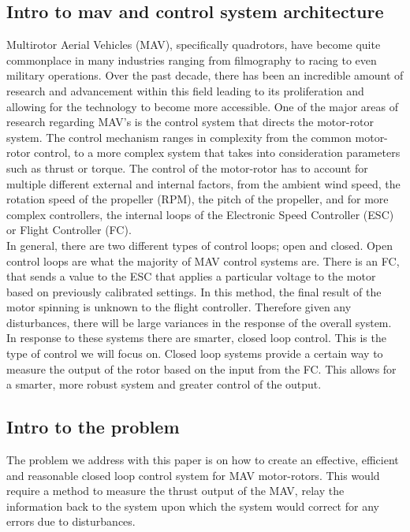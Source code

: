 \documentclass[conference]{IEEEtran}
\begin{document}
	\subsection{Intro to mav and control system architecture}
	Multirotor Aerial Vehicles (MAV), specifically quadrotors, have become quite commonplace in many industries ranging from filmography to racing to even military operations. Over the past decade, there has been an incredible amount of research and advancement within this field leading to its proliferation and allowing for the technology to become more accessible. One of the major areas of research regarding MAV's is the control system that directs the motor-rotor system. The control mechanism ranges in complexity from the common motor-rotor control, to a more complex system that takes into consideration parameters such as thrust or torque. The control of the motor-rotor has to account for multiple different external and internal factors, from the ambient wind speed, the rotation speed of the propeller (RPM), the pitch of the propeller, and for more complex controllers, the internal loops of the Electronic Speed Controller (ESC) or Flight Controller (FC). \\
	In general, there are two different types of control loops; open and closed. Open control loops are what the majority of MAV control systems are. There is an FC, that sends a value to the ESC that applies a particular voltage to the motor based on previously calibrated settings. In this method, the final result of the motor spinning is unknown to the flight controller. Therefore given any disturbances, there will be large variances in the response of the overall system. In response to these systems there are smarter, closed loop control. This is the type of control we will focus on. Closed loop systems provide a certain way to measure the output of the rotor based on the input from the FC. This allows for a smarter, more robust system and greater control of the output. \\
	\subsection{Intro to the problem}
	The problem we address with this paper is on how to create an effective, efficient and reasonable closed loop control system for MAV motor-rotors. This would require a method to measure the thrust output of the MAV, relay the information back to the system upon which the system would correct for any errors due to disturbances.
\end{document}
